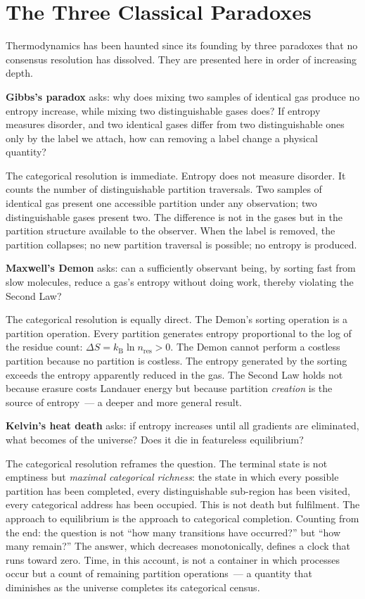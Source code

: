 \section*{The Three Classical Paradoxes}

Thermodynamics has been haunted since its founding by three paradoxes that no
consensus resolution has dissolved. They are presented here in order of increasing
depth.

\textbf{Gibbs's paradox} asks: why does mixing two samples of identical gas produce
no entropy increase, while mixing two distinguishable gases does? If entropy measures
disorder, and two identical gases differ from two distinguishable ones only by the
label we attach, how can removing a label change a physical quantity?

The categorical resolution is immediate. Entropy does not measure disorder.
It counts the number of distinguishable partition traversals. Two samples of identical
gas present one accessible partition under any observation; two distinguishable gases
present two. The difference is not in the gases but in the partition structure available
to the observer. When the label is removed, the partition collapses; no new partition
traversal is possible; no entropy is produced.

\textbf{Maxwell's Demon} asks: can a sufficiently observant being, by sorting fast from
slow molecules, reduce a gas's entropy without doing work, thereby violating the
Second Law?

The categorical resolution is equally direct. The Demon's sorting operation is a
partition operation. Every partition generates entropy proportional to the log of the
residue count: $\Delta S = k_{\mathrm{B}} \ln n_{\text{res}} > 0$. The Demon cannot
perform a costless partition because no partition is costless. The entropy generated
by the sorting exceeds the entropy apparently reduced in the gas. The Second Law holds
not because erasure costs Landauer energy but because partition \emph{creation} is
the source of entropy~--- a deeper and more general result.

\textbf{Kelvin's heat death} asks: if entropy increases until all gradients are
eliminated, what becomes of the universe? Does it die in featureless equilibrium?

The categorical resolution reframes the question. The terminal state is not emptiness
but \emph{maximal categorical richness}: the state in which every possible partition
has been completed, every distinguishable sub-region has been visited, every
categorical address has been occupied. This is not death but fulfilment. The approach
to equilibrium is the approach to categorical completion. Counting from the end:
the question is not ``how many transitions have occurred?'' but ``how many remain?''
The answer, which decreases monotonically, defines a clock that runs toward zero.
Time, in this account, is not a container in which processes occur but a count of
remaining partition operations~--- a quantity that diminishes as the universe completes
its categorical census.


